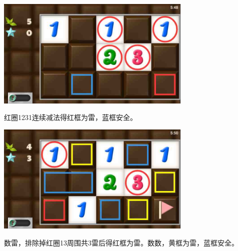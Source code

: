 \subsection{} %
\begin{center}
    \includegraphics[width=0.7\textwidth]{puzzlelow/65-1.jpg}
\end{center}
红圈1231连续减法得红框为雷，蓝框安全。
\begin{center}
    \includegraphics[width=0.7\textwidth]{puzzlelow/65-2.jpg}
\end{center}
数雷，排除掉红圈13周围共3雷后得红框为雷。数数，黄框为雷，蓝框安全。

